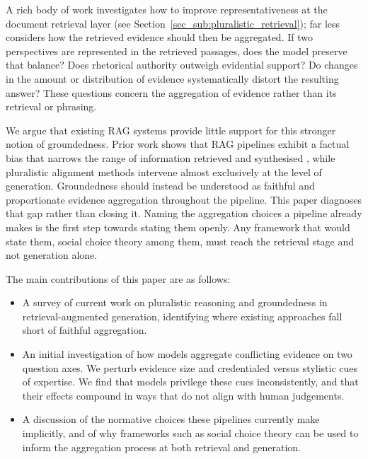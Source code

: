 A rich body of work investigates how to improve representativeness at the document retrieval layer (see
Section~\ref{sec_sub:pluralistic_retrieval}); far less considers how the retrieved evidence should then be aggregated. If two perspectives are represented in the retrieved passages, does the model preserve that balance? Does rhetorical authority outweigh evidential support? Do changes in the amount or distribution of evidence systematically distort the resulting answer? These questions concern the aggregation of evidence rather than its retrieval or phrasing.

We argue that existing RAG systems provide little support for this stronger notion of groundedness. Prior work shows that RAG pipelines exhibit a factual bias that narrows the range of information retrieved and synthesised \citep{agrawal2026retrievalaugmentedgenerationfactualgrounding}, while pluralistic alignment methods intervene almost exclusively at the level of generation. Groundedness should instead be understood as faithful and proportionate evidence aggregation throughout the pipeline. This paper diagnoses that gap rather than closing it. Naming the aggregation choices a pipeline already makes is the first step towards stating them openly. Any framework that would state them, social choice theory \citep{arrow1951socialchoice} among them, must reach the retrieval stage and not generation alone.

The main contributions of this paper are as follows:
\begin{itemize}
    \item A survey of current work on pluralistic reasoning and groundedness in retrieval-augmented generation, identifying where existing approaches fall short of faithful aggregation.
    \item An initial investigation of how models aggregate conflicting evidence on two question axes. We perturb evidence size and credentialed versus stylistic cues of expertise. We find that models privilege these cues inconsistently, and that their effects compound in ways that do not align with human judgements.
    \item A discussion of the normative choices these pipelines currently make implicitly, and of why frameworks such as social choice theory can be used to inform the aggregation process at both retrieval and generation.
\end{itemize}
